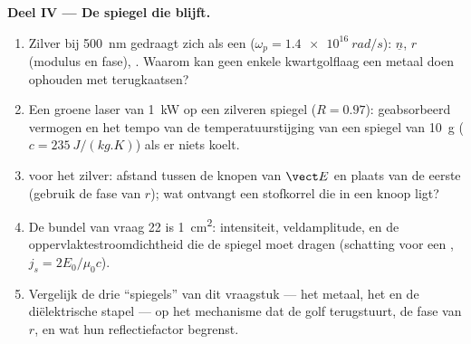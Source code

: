 \begin{problem}
\medskip
\noindent\textbf{Deel IV --- De spiegel die blijft.}
\begin{enumerate}[resume]
  \item Zilver bij \qty{500}{nm} gedraagt zich als een 
        ($\omega_p = \qty{1.4e16}{rad/s}$): $\underline n$, $r$ (modulus en
        fase), . Waarom kan geen enkele kwartgolflaag een
        metaal doen ophouden met terugkaatsen?
  \item Een groene laser van \qty{1}{kW} op een zilveren spiegel
        ($R = 0.97$): geabsorbeerd vermogen en het tempo van de
        temperatuurstijging van een spiegel van \qty{10}{g}
        ($c = \qty{235}{J/(kg.K)}$) als er niets koelt.
  \item {} voor het zilver: afstand tussen de knopen van $\vect E$
        en plaats van de eerste (gebruik de fase van $r$); wat ontvangt een
        stofkorrel die in een knoop ligt?
  \item De bundel van vraag 22 is \qty{1}{cm^2}: intensiteit, veldamplitude,
        en de oppervlaktestroomdichtheid die de spiegel moet dragen
        (schatting voor een , $j_s = 2E_0/\mu_0c$).
  \item Vergelijk de drie ``spiegels'' van dit vraagstuk --- het metaal, het
         en de diëlektrische stapel --- op het mechanisme dat de golf
        terugstuurt, de fase van $r$, en wat hun reflectiefactor begrenst.
\end{enumerate}
\end{problem}
